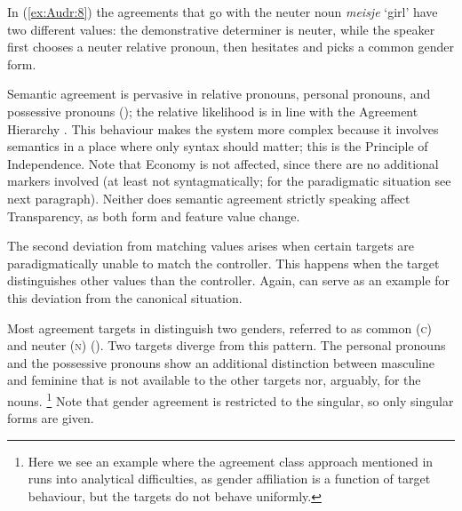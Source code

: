 \documentclass[output=collectionpaper]{langsci/langscibook}
\begin{document}
In (\ref{ex:Audr:8}) the agreements that go with the neuter noun \textit{meisje} `girl' have two different values: the demonstrative determiner is neuter, while the speaker first chooses a neuter relative pronoun, then hesitates and picks a common gender form.

Semantic agreement is pervasive in  relative pronouns, personal pronouns, and possessive pronouns (\citealt{Audring2006,Audring2009}); the relative likelihood is in line with the Agreement Hierarchy \citep{Corbett1979}. This behaviour makes the system more complex because it involves semantics in a place where only syntax should matter; this is the Principle of Independence. Note that Economy is not affected, since there are no additional markers involved (at least not syntagmatically; for the paradigmatic situation see next paragraph). Neither does semantic agreement \textendash{} strictly speaking \textendash{} affect Transparency, as both form and feature value change.

The second deviation from matching values arises when certain targets are paradigmatically unable to match the controller. This happens when the target distinguishes other values than the controller. Again,  can serve as an example for this deviation from the canonical situation.

Most agreement targets in  distinguish two genders, referred to as common (\textsc{c}) and neuter (\textsc{n}) (). Two targets diverge from this pattern. The personal pronouns and the possessive pronouns show an additional distinction between masculine and feminine that is not available to the other targets nor, arguably, for the nouns.%
\footnote{Here we see an example where the agreement class approach mentioned in  runs into analytical difficulties, as gender affiliation is a function of target behaviour, but the targets do not behave uniformly.} %
Note that gender agreement is restricted to the singular, so only singular forms are given.
\end{document}

